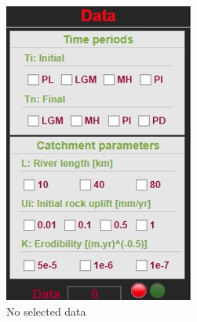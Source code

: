\documentclass[11pt,a4paper,titlepage]{report}
\begin{document}
\begin{figure}[H]
    \centering
    \begin{subfigure}[H]{0.2\textwidth}
        \includegraphics[width=\textwidth]{data1.jpg}
        \caption{No selected data}
    \end{subfigure}
    \quad
    \begin{subfigure}[H]{0.2\textwidth}

\end{subfigure}
\end{figure}
\end{document}
